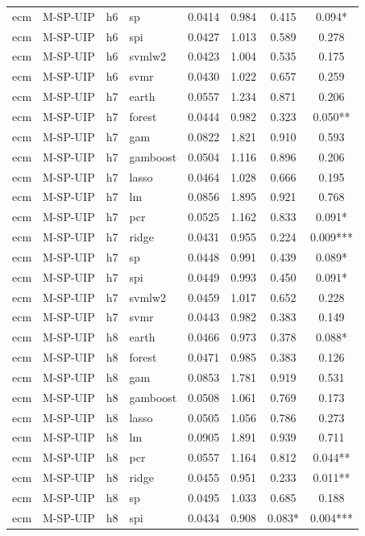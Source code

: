 \begin{ThreePartTable}
\begin{longtable}[t]{llclcccc}
ecm & M-SP-UIP & h6 & sp & 0.0414 & 0.984 & 0.415 & 0.094*\\
ecm & M-SP-UIP & h6 & spi & 0.0427 & 1.013 & 0.589 & 0.278\\
ecm & M-SP-UIP & h6 & svmlw2 & 0.0423 & 1.004 & 0.535 & 0.175\\
ecm & M-SP-UIP & h6 & svmr & 0.0430 & 1.022 & 0.657 & 0.259\\
\addlinespace
ecm & M-SP-UIP & h7 & earth & 0.0557 & 1.234 & 0.871 & 0.206\\
ecm & M-SP-UIP & h7 & forest & 0.0444 & 0.982 & 0.323 & 0.050**\\
ecm & M-SP-UIP & h7 & gam & 0.0822 & 1.821 & 0.910 & 0.593\\
ecm & M-SP-UIP & h7 & gamboost & 0.0504 & 1.116 & 0.896 & 0.206\\
ecm & M-SP-UIP & h7 & lasso & 0.0464 & 1.028 & 0.666 & 0.195\\
ecm & M-SP-UIP & h7 & lm & 0.0856 & 1.895 & 0.921 & 0.768\\
ecm & M-SP-UIP & h7 & pcr & 0.0525 & 1.162 & 0.833 & 0.091*\\
ecm & M-SP-UIP & h7 & ridge & 0.0431 & 0.955 & 0.224 & 0.009***\\
ecm & M-SP-UIP & h7 & sp & 0.0448 & 0.991 & 0.439 & 0.089*\\
ecm & M-SP-UIP & h7 & spi & 0.0449 & 0.993 & 0.450 & 0.091*\\
ecm & M-SP-UIP & h7 & svmlw2 & 0.0459 & 1.017 & 0.652 & 0.228\\
ecm & M-SP-UIP & h7 & svmr & 0.0443 & 0.982 & 0.383 & 0.149\\
\addlinespace
ecm & M-SP-UIP & h8 & earth & 0.0466 & 0.973 & 0.378 & 0.088*\\
ecm & M-SP-UIP & h8 & forest & 0.0471 & 0.985 & 0.383 & 0.126\\
ecm & M-SP-UIP & h8 & gam & 0.0853 & 1.781 & 0.919 & 0.531\\
ecm & M-SP-UIP & h8 & gamboost & 0.0508 & 1.061 & 0.769 & 0.173\\
ecm & M-SP-UIP & h8 & lasso & 0.0505 & 1.056 & 0.786 & 0.273\\
ecm & M-SP-UIP & h8 & lm & 0.0905 & 1.891 & 0.939 & 0.711\\
ecm & M-SP-UIP & h8 & pcr & 0.0557 & 1.164 & 0.812 & 0.044**\\
ecm & M-SP-UIP & h8 & ridge & 0.0455 & 0.951 & 0.233 & 0.011**\\
ecm & M-SP-UIP & h8 & sp & 0.0495 & 1.033 & 0.685 & 0.188\\
ecm & M-SP-UIP & h8 & spi & 0.0434 & 0.908 & 0.083* & 0.004***\\

\end{longtable}
\end{ThreePartTable}
